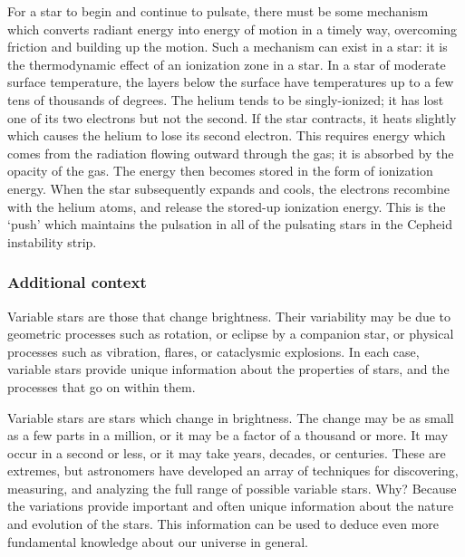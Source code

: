 \documentclass[a4paper,10pt]{article}
\begin{document}
{\noindent}For a star to begin and continue to pulsate, there must be some mechanism which converts radiant energy into energy of motion in a timely way, overcoming friction and building up the motion. Such a mechanism can exist in a star: it is the thermodynamic effect of an ionization zone in a star. In a star of moderate surface temperature, the layers below the surface have temperatures up to a few tens of thousands of degrees. The helium tends to be singly-ionized; it has lost one of its two electrons but not the second. If the star contracts, it heats slightly which causes the helium to lose its second electron. This requires energy which comes from the radiation flowing outward through the gas; it is absorbed by the opacity of the gas. The energy then becomes stored in the form of ionization energy. When the star subsequently expands and cools, the electrons recombine with the helium atoms, and release the stored-up ionization energy. This is the `push' which maintains the pulsation in all of the pulsating stars in the Cepheid instability strip.

\subsubsection{Additional context}

Variable stars are those that change brightness. Their variability may be due to geometric processes such as rotation, or eclipse by a companion star, or physical processes such as vibration, flares, or cataclysmic explosions. In each case, variable stars provide unique information about the properties of stars, and the processes that go on within them.

{\noindent}Variable stars are stars which change in brightness. The change may be as small as a few parts in a million, or it may be a factor of a thousand or more. It may occur in a second or less, or it may take years, decades, or centuries. These are extremes, but astronomers have developed an array of techniques for discovering, measuring, and analyzing the full range of possible variable stars. Why? Because the variations provide important and often unique information about the nature and evolution of the stars. This information can be used to deduce even more fundamental knowledge about our universe in general.
\end{document}
